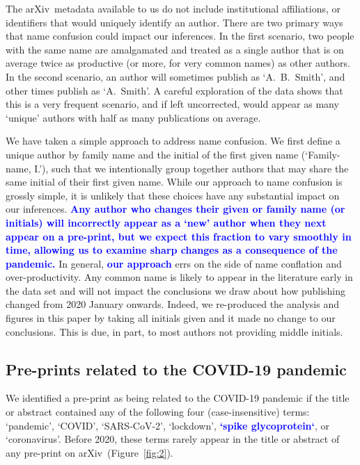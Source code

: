 \documentclass[]{rsos}%
\newcommand{\arxiv}{arXiv}
\newcommand{\change}[1]{\textcolor{blue}{\textbf{#1}}}
\begin{document}
The \arxiv\ metadata available to us do not include institutional affiliations, or identifiers that would uniquely identify an author. 
There are two primary ways that name confusion could impact our inferences. In the first scenario, two people with the same name are amalgamated and treated as a single author that is on average twice as productive (or more, for very common names) as other authors. In the second scenario, an author will sometimes publish as `A.~B.~Smith', and other times publish as `A.~Smith'. A careful exploration of the data shows that this is a very frequent scenario, and if left uncorrected, would appear as many `unique' authors with half as many publications on average.

We have taken a simple approach to address name confusion. We first define a unique author by family name and the initial of the first given name (`Family-name, I.'), such that we intentionally group together authors that may share the same initial of their first given name. 
While our approach to name confusion is grossly simple, it is unlikely that these choices have any substantial impact on our inferences. \change{Any author who changes their given or family name (or initials) will incorrectly appear as a `new' author when they next appear on a pre-print, but we expect this fraction to vary smoothly in time, allowing us to examine sharp changes as a consequence of the pandemic.} In general, \change{our approach} errs on the side of name conflation and over-productivity. 
Any common name is likely to appear in the literature early in the data set and will not impact the conclusions we draw about how publishing changed from 2020 January onwards. Indeed, we re-produced the analysis and figures in this paper by taking all initials given and it made no change to our conclusions. This is due, in part, to most authors not providing middle initials.

\subsection*{Pre-prints related to the COVID-19 pandemic}

We identified a pre-print as being related to the COVID-19 pandemic if the title or abstract contained any of the following four (case-insensitive) terms: `pandemic', `COVID', `SARS-CoV-2', `lockdown', \change{`spike glycoprotein`}, or `coronavirus'. Before 2020, these terms rarely appear in the title or abstract of any pre-print on \arxiv\ (Figure~\ref{fig:2}). 
\end{document}
